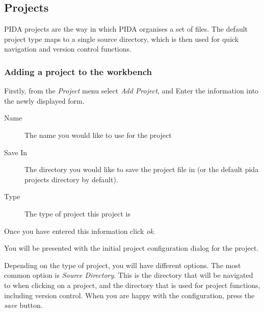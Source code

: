 \documentclass[10pt,a4paper,english]{article}
\begin{document}

\hypertarget{projects}{}
\subsection*{Projects}

PIDA projects are the way in which PIDA organises a set of files. The default
project type maps to a single source directory, which is then used for quick
navigation and version control functions.



\hypertarget{adding-a-project-to-the-workbench}{}
\subsubsection*{Adding a project to the workbench}

Firstly, from the \emph{Project} menu select \emph{Add Project}, and Enter the
information into the newly displayed form.
\begin{description}
\item[Name] %

The name you would like to use for the project

\item[Save In] %

The directory you would like to save the project file in (or the default
pida projects directory by default).

\item[Type] %

The type of project this project is

\end{description}

Once you have entered this information click \emph{ok}.

You will be presented with the initial project configuration dialog for the
project.

Depending on the type of project, you will have different options. The most
common option is \emph{Source Directory}. This is the directory that will be
navigated to when clicking on a project, and the directory that is used for
project functions, including version control. When you are happy with the
configuration, press the \emph{save} button.
\end{document}
